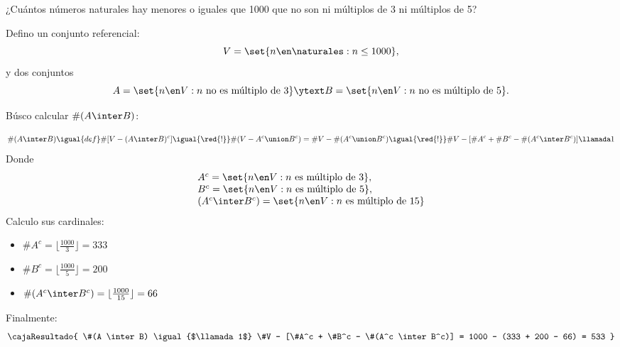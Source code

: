 \begin{enunciado}{\ejercicio}
  ¿Cuántos números naturales hay menores o iguales que 1000 que no son ni múltiplos
  de 3 ni múltiplos de 5?
\end{enunciado}

Defino un conjunto referencial:
$$
  V = \set{n \en \naturales : n \leq 1000},$$
y dos conjuntos
$$
  A = \set{n \en V : n \text{ no es múltiplo de } 3}
  \ytext
  B = \set{n \en V : n \text{ no es múltiplo de } 5}.
$$

Búsco calcular $\#(A \inter B)$:

$$
  \#(A \inter B)
  \igual{def}
  \#[V - (A \inter B)^c]
  \igual{\red{!}}
  \#(V - A^c \union B^c) = \#V - \#(A^c \union B^c)
  \igual{\red{!}}
  \#V - [\#A^c + \#B^c - \#(A^c \inter B^c)]\llamada1
$$
Donde
$$
  \begin{array}{l}
    A^c = \set{n \en V : n \text{ es múltiplo de } 3}, \\
    B^c = \set{n \en V : n \text{ es múltiplo de } 5}, \\
    (A^c \inter B^c) = \set{n \en V : n \text{ es múltiplo de } 15}
  \end{array}
$$
Calculo sus cardinales:
\begin{multicols}{3}
  \begin{itemize}
    \item $\#A^c = \lfloor \frac{1000}{3} \rfloor = 333$
    \item $\#B^c = \lfloor \frac{1000}{5} \rfloor = 200$
    \item $\#(A^c \inter B^c) = \lfloor \frac{1000}{15} \rfloor = 66$
  \end{itemize}
\end{multicols}

Finalmente:
$$
  \cajaResultado{
  \#(A \inter B)
  \igual{$\llamada1$}
  \#V - [\#A^c + \#B^c - \#(A^c \inter B^c)]
  =
  1000 - (333 + 200 - 66) = 533
  }
$$

\begin{aportes}
  \item {}
\end{aportes}
